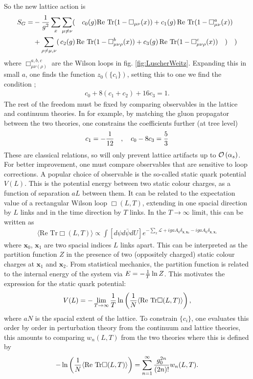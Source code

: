 So the new lattice action is
\begin{align}
  S_G =& - {1\over g^2} \sum_x \sum_{\mu\neq \nu}(\quad c_0(g) \text{Re Tr} (1-\Box_{\mu\nu}(x)) + c_1(g) \,\text{Re Tr} (1 - \Box^a_{\mu\nu}(x)) \\
  & + \sum_{\rho\neq \mu,\nu}( \,c_2(g)\, \text{Re Tr} (1 - \Box^b_{\mu\nu\rho}(x)) + c_3(g) \, \text{Re Tr} (1 - \Box^c_{\mu\nu\rho}(x))\quad)\quad)
\end{align}
where $\Box^{a,b,c}_{\mu\nu(\rho)}$ are the Wilson loops in fig. \ref{fig:LuscherWeitz}. Expanding this in small $a$, one finds the function $z_0(\{c_i\})$, setting this to one we find the condition \cite{WEISZ19831};
\begin{align}
  c_0 + 8 (c_1 + c_2) + 16 c_3 = 1.
\end{align}
The rest of the freedom must be fixed by comparing observables in the lattice and continuum theories. In \cite{WEISZ1984397} for example, by matching the gluon propagator between the two theories, one constrains the coefficients further (at tree level)
\begin{align}
  c_1 = -{1\over 12} \quad,\quad
  c_0 - 8c_3 = {5\over 3}
\end{align}
These are classical relations, so will only prevent lattice artifacts up to $\mathcal{O}\left( \alpha_s \right)$. For better improvement, one must compare observables that are sensitive to loop corrections. A popular choice of observable is the so-called static quark potential $V(L)$. This is the potential energy between two static colour charges, as a function of separation $aL$ between them. It can be related to the expectation value of a rectangular Wilson loop $\Box(L,T)$, extending in one spacial direction by $L$ links and in the time direction by $T$ links. In the $T\to \infty$ limit, this can be written as
\begin{align}
  \langle \text{Re Tr} \Box(L,T) \rangle \propto \int [d\psi d\bar{\psi} dU] e^{-\sum_x \mathcal{L} + igaA_0 \delta_{{\textbf{x}},{\textbf{x}}_0}  - igaA_0 \delta_{{\textbf{x}},{\textbf{x}}_1} }
\end{align}
where $\textbf{x}_0$, $\textbf{x}_1$ are two spacial indices $L$ links apart. This can be interpreted as the partition function $Z$ in the presence of two (oppositely charged) static colour charges at $\textbf{x}_1$ and $\textbf{x}_2$. From statistical mechanics, the partition function is related to the internal energy of the system via $E = -{1\over T} \ln Z$. This motivates the expression for the static quark potential:
\begin{align}
  V(L) = - \lim_{T\to \infty} {1\over T} \ln \left( {1\over N} \langle \text{Re Tr} \Box(L,T) \rangle \right),
\end{align}
where $aN$ is the spacial extent of the lattice. To constrain $\{c_i\}$, one evaluates this order by order in perturbation theory from the continuum and lattice theories, this amounts to comparing $w_n(L,T)$ from the two theories where this is defined by
\begin{align}
  - \ln \left( {1\over N} \langle \text{Re Tr} \Box(L,T) \rangle \right) = \sum_{n=1}^{\infty} { g_0^{2n} \over (2n)! } w_n(L,T).
\end{align}

